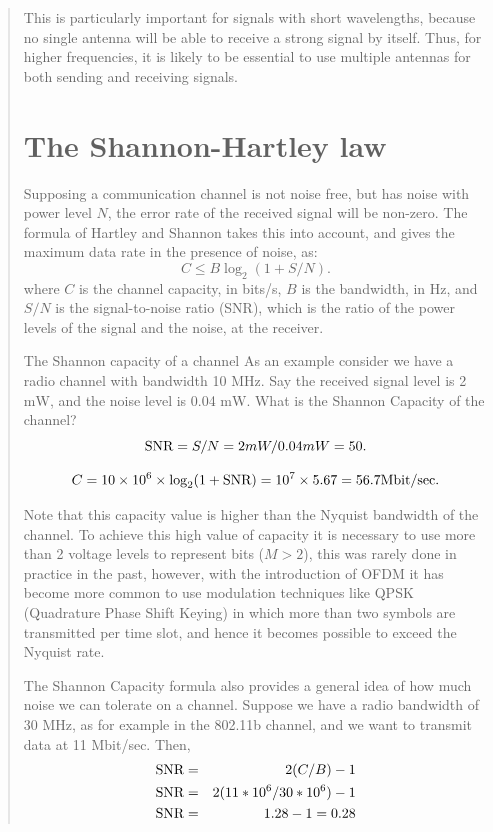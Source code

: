 \begin{quote}
This is particularly important for signals with short wavelengths, because no single
antenna will be able to receive a strong signal by itself. Thus, for higher frequencies,
it is likely to be essential to use multiple antennas for both sending and receiving signals.

\section{The Shannon-Hartley law}\label{shannonhartley}

Supposing a communication channel is not noise free, but has noise with power level $N$, the
error rate of the received signal will be non-zero. The formula of Hartley and
Shannon takes this into account, and gives the maximum data rate in the presence of noise,
as:
$$
C \leq B \log_{2} (1 + S/N). 
$$
where $C$ is the channel capacity, in bits/s, $B$ is the bandwidth, in Hz, and $S/N$ is the 
signal-to-noise ratio (SNR),
which is the ratio of the power levels of the signal and the noise, 
at the receiver. 

\begin{sbexample}{The Shannon capacity of a channel}%
As an example consider we have a radio channel with bandwidth 10
\textsc{MH}z. Say the received signal level is 2 m\textsc{W}, and the
noise level is 0.04 m\textsc{W}. What is the Shannon Capacity of the
channel?  
$$ 
\hbox{SNR} = S/N = 2mW / 0.04 mW = 50 .  
$$

$$
C = 10\times 10^{6} \times \log_{2}(1 + \hbox{SNR}) = 10^{7} \times 5.67 = 56.7 \hbox{Mbit/sec} .
$$
\end{sbexample}


Note that this capacity value is higher than the Nyquist bandwidth of
the channel. To achieve this high value of capacity it is necessary to
use more than 2 voltage levels to represent bits ($M > 2$), this was
rarely done in practice in the past, however, with the introduction of
OFDM it has become more common to use modulation techniques like QPSK
(Quadrature Phase Shift Keying) in which more than two symbols are transmitted per time slot,
and hence it becomes possible to exceed the Nyquist rate.

The Shannon Capacity formula also provides a general idea of how much noise we can 
tolerate on a channel. Suppose we have a radio bandwidth of 30 MHz, as for example in the
802.11b channel, and we want to transmit data at 11 Mbit/sec. Then,
\begin{eqnarray}\nonumber
\hbox{SNR} &=& 2(C/B)-1 \\
\nonumber
\hbox{SNR} &=& 2(11*10^{6}/30*10^{6})-1 \\
\nonumber
\hbox{SNR} &=& 1.28-1=0.28
\end{eqnarray}


\end{quote}
